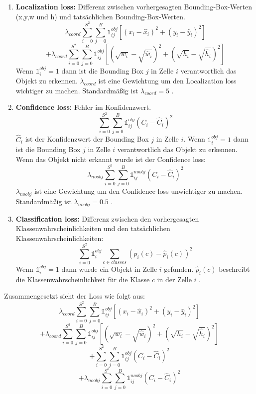 \documentclass[conference]{IEEEtran}
\begin{document}
	\begin{enumerate}
		\item \textbf{Localization loss:} Differenz zwischen vorhergesagten Bounding-Box-Werten (x,y,w und h) und tatsächlichen Bounding-Box-Werten.
		\[ \lambda_{coord} \sum_{i=0}^{S^2}\sum_{j=0}^{B} \mathbb{1}_{i j}^{obj} [(x_i - \hat{x}_i )^2 + (y_i - \hat{y}_i )^2] \]
		\[ + \lambda_{coord} \sum_{i=0}^{S^2}\sum_{j=0}^{B} \mathbb{1}_{i j}^{obj} [(\sqrt{w_i} - \sqrt{\hat{w}_i} )^2 + (\sqrt{h_i} - \sqrt{\hat{h}_i} )^2] \]
		Wenn $\mathbb{1}_{i}^{obj} = 1$ dann ist die Bounding Box $j$ in Zelle $i$ verantwortlich das Objekt zu erkennen. $\lambda_{coord}$ ist eine Gewichtung um den Localization loss wichtiger zu machen. Standardmäßig ist $\lambda_{coord} = 5$ \cite{b5}.
		
		\item \textbf{Confidence loss:} Fehler im Konfidenzwert.
		\[  \sum_{i=0}^{S^2}\sum_{j=0}^{B} \mathbb{1}_{i j}^{obj} (C_i - \hat{C}_i)^2 \]
		$\hat{C}_i$ ist der Konfidenzwert der Bounding Box $j$ in Zelle $i$. Wenn $\mathbb{1}_{i}^{obj} = 1$ dann ist die Bounding Box $j$ in Zelle $i$ verantwortlich das Objekt zu erkennen.\\
		Wenn das Objekt nicht erkannt wurde ist der Confidence loss:
		\[  \lambda_{noobj} \sum_{i=0}^{S^2}\sum_{j=0}^{B} \mathbb{1}_{i j}^{noobj} (C_i - \hat{C}_i)^2 \]
		$\lambda_{noobj}$ ist eine Gewichtung um den Confidence loss unwichtiger zu machen. Standardmäßig ist $\lambda_{noobj} = 0.5$ \cite{b5}.
		
		\item \textbf{Classification loss:} Differenz zwischen den vorhergesagten Klassenwahrscheinlichkeiten und den tatsächlichen Klassenwahrscheinlichkeiten:
		\[ \sum_{i=0}^{S^2} \mathbb{1}_{i}^{obj} \sum_{c \in classes} (p_i(c) - \hat{p}_i(c))^2 \]
		Wenn $\mathbb{1}_{i}^{obj} = 1$ dann wurde ein Objekt in Zelle $i$ gefunden.
		$\hat{p}_i(c)$ beschreibt die Klassenwahrscheinlichkeit für die Klasse $c$ in der Zelle $i$ \cite{b5}.
	\end{enumerate}
	Zusammengesetzt sieht der Loss wie folgt aus:
	\[ \lambda_{coord} \sum_{i=0}^{S^2}\sum_{j=0}^{B} \mathbb{1}_{i j}^{obj} [(x_i - \hat{x}_i )^2 + (y_i - \hat{y}_i )^2] \]
	\[ + \lambda_{coord} \sum_{i=0}^{S^2}\sum_{j=0}^{B} \mathbb{1}_{i j}^{obj} [(\sqrt{w_i} - \sqrt{\hat{w}_i} )^2 + (\sqrt{h_i} - \sqrt{\hat{h}_i} )^2] \]
	\[ + \sum_{i=0}^{S^2}\sum_{j=0}^{B} \mathbb{1}_{i j}^{obj} (C_i - \hat{C}_i)^2 \]
	\[ + \lambda_{noobj} \sum_{i=0}^{S^2}\sum_{j=0}^{B} \mathbb{1}_{i j}^{noobj} (C_i - \hat{C}_i)^2 \]
\end{document}
